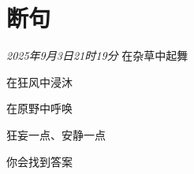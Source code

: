 \section*{断句}
\begin{center}
\textit{2025年9月3日21时19分}\hh 
在杂草中起舞

在狂风中浸沐

在原野中呼唤

狂妄一点、安静一点

你会找到答案
\end{center}